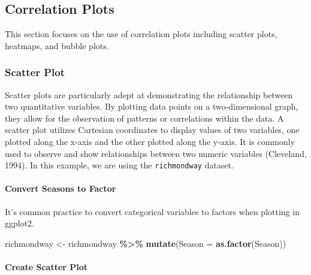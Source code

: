 \documentclass[
]{book}
\newenvironment{Shaded}{\begin{snugshade}}{\end{snugshade}}
\newcommand{\AttributeTok}[1]{\textcolor[rgb]{0.13,0.29,0.53}{#1}}
\newcommand{\FunctionTok}[1]{\textcolor[rgb]{0.13,0.29,0.53}{\textbf{#1}}}
\newcommand{\NormalTok}[1]{#1}
\newcommand{\OtherTok}[1]{\textcolor[rgb]{0.56,0.35,0.01}{#1}}
\newcommand{\SpecialCharTok}[1]{\textcolor[rgb]{0.81,0.36,0.00}{\textbf{#1}}}
\begin{document}
\subsection*{Correlation Plots}\label{correlation-plots}

This section focuses on the use of correlation plots including scatter plots, heatmaps, and bubble plots.

\subsubsection*{Scatter Plot}\label{scatter-plot}

Scatter plots are particularly adept at demonstrating the relationship between two quantitative variables. By plotting data points on a two-dimensional graph, they allow for the observation of patterns or correlations within the data. A scatter plot utilizes Cartesian coordinates to display values of two variables, one plotted along the x-axis and the other plotted along the y-axis. It is commonly used to observe and show relationships between two numeric variables (Cleveland, 1994). In this example, we are using the \texttt{richmondway} dataset.

\paragraph*{Convert Seasons to Factor}\label{convert-seasons-to-factor}

It's common practice to convert categorical variables to factors when plotting in ggplot2.

\begin{Shaded}
\begin{Highlighting}[]
\NormalTok{richmondway }\OtherTok{\textless{}{-}}\NormalTok{ richmondway }\SpecialCharTok{\%\textgreater{}\%}
  \FunctionTok{mutate}\NormalTok{(}\AttributeTok{Season =} \FunctionTok{as.factor}\NormalTok{(Season))}
\end{Highlighting}
\end{Shaded}

\paragraph*{Create Scatter Plot}\label{create-scatter-plot}
\end{document}

